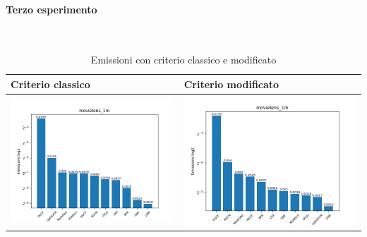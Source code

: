 \paragraph{Terzo esperimento} \textcolor{white}{.} \\
\begin{table}[H]
    \centering
    \footnotesize
    \setlength\tabcolsep{0pt}
    \begin{tabularx}{\textwidth}{|X|X|}
        \hline
        \textbf{Criterio classico} & \textbf{Criterio modificato} \\
        \hline
        \includegraphics[width=\linewidth, trim=0 0 0 0]{images/emissions_movielens_1m_40_6_earlyClassic.png} &
        \includegraphics[width=\linewidth, trim=0 0 0 0]{images/emissions_movielens_1m_40_6_earlyModified.png} \\
        \hline
    \end{tabularx}
    \caption{Emissioni con criterio classico e modificato}
    \label{tab:emissions_info}
\end{table}




